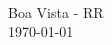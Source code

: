 \begin{titlepage}
\begin{center}
        {\bfseries\Large 
            \makeatletter
            \@author
            \makeatother
        }\\[1.5cm]

        {\bfseries\LARGE 
            \makeatletter
            \@title
            \makeatother
        }

        \vfill

        {\large Boa Vista - RR\\
        \today}
    \end{center}
\end{titlepage}
